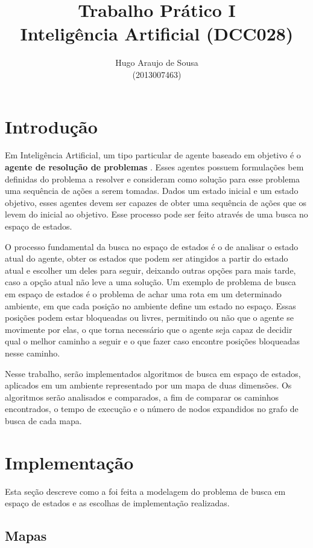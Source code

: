 \documentclass[12pt]{article}
\title{Trabalho Prático I \\ Inteligência Artificial (DCC028)}
\author{Hugo Araujo de Sousa \\ (2013007463)}
\begin{document}
 

\maketitle

\section{Introdução}

Em Inteligência Artificial, um tipo particular de agente baseado em objetivo é o \textbf{agente de resolução de problemas} \cite{russell2016artificial}. Esses agentes possuem formulações bem definidas do problema a resolver e consideram como solução para esse problema uma sequência de ações a serem tomadas. Dados um estado inicial e um estado objetivo, esses agentes devem ser capazes de obter uma sequência de ações que os levem do inicial ao objetivo. Esse processo pode ser feito através de uma busca no espaço de estados.

O processo fundamental da busca no espaço de estados é o de analisar o estado atual do agente, obter os estados que podem ser atingidos a partir do estado atual e escolher um deles para seguir, deixando outras opções para mais tarde, caso a opção atual não leve a uma solução. Um exemplo de problema de busca em espaço de estados é o problema de achar uma rota em um determinado ambiente, em que cada posição no ambiente define um estado no espaço. Essas posições podem estar bloqueadas ou livres, permitindo ou não que o agente se movimente por elas, o que torna necessário que o agente seja capaz de decidir qual o melhor caminho a seguir e o que fazer caso encontre posições bloqueadas nesse caminho.

Nesse trabalho, serão implementados algoritmos de busca em espaço de estados, aplicados em um ambiente representado por um mapa de duas dimensões. Os algoritmos serão analisados e comparados, a fim de comparar os caminhos encontrados, o tempo de execução e o número de nodos expandidos no grafo de busca de cada mapa.

\section{Implementação}

Esta seção descreve como a foi feita a modelagem do problema de busca em espaço de estados e as escolhas de implementação realizadas.

\subsection{Mapas} \label{sec:impmap}
\end{document}
